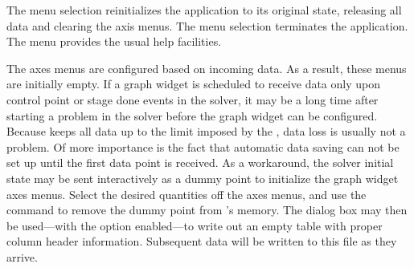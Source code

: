 The menu selection  reinitializes the
 application to its original state, releasing all data and
clearing the axis menus.  The menu selection 
terminates the application.  The menu  provides the usual help
facilities.

The axes menus are configured based on incoming data.  As a result,
these menus are initially empty.  If a graph widget is scheduled to
receive data only upon control point or stage done events in the solver,
it may be a long time after starting a problem in the solver before the
graph widget can be configured.  Because  keeps all data up
to the limit imposed by the , data loss is usually
not a problem.  Of more importance is the fact that automatic data
saving can not be set up until the first data point is
received.  As a workaround, the solver initial state may be sent
interactively as a dummy point to initialize the graph widget axes
menus.  Select the desired quantities off the axes menus, and use the
 command to remove the dummy point from
's memory.  The {} dialog box may
then be used---with the {} option enabled---to write out
an empty table with proper column header information.  Subsequent data
will be written to this file as they arrive.


